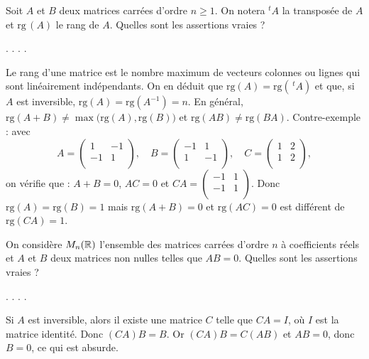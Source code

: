 \begin{question}
Soit $A$ et $B$ deux matrices carrées d'ordre $n\ge 1$. On notera $^tA$ la transposée de $A$ et $\mbox{rg}\, (A)$ le rang de $A$. 
Quelles sont les assertions vraies ?
\begin{answers}  
.
.
.
.   
\end{answers}
\begin{explanations} Le rang d'une matrice est le nombre maximum de vecteurs colonnes ou lignes qui sont linéairement indépendants. On en déduit que $\mbox{rg}(A)=\mbox{rg}(\, ^tA)$ et que, si $A$ est inversible, $\mbox{rg}(A)=\mbox{rg}(A^{-1})=n$.
\vskip0mm
En général, $\mbox{rg}(A+B)\neq \max \big(\mbox{rg}(A), \mbox{rg}(B)\big)$ et $\mbox{rg}(AB)\neq \mbox{rg}(BA)$. Contre-exemple : avec 
$$A = \left(\begin{array}{rc}
1&-1\\-1&1\\ \end{array}\right),\quad B = \left(\begin{array}{rc}
-1&1\\ 1&-1\\ \end{array}\right),\quad C = 
\left(\begin{array}{rc} 1&2\\1&2\\ \end{array}\right),$$
on vérifie que :  $A+B =0$, $AC =0$ et $CA=
\left(\begin{array}{rc}-1&1\\
-1&1\\ \end{array}\right)$. Donc $\mbox{rg}(A)=\mbox{rg}(B)=1$ mais $\mbox{rg}(A+B)=0$ et $\mbox{rg}(AC)= 0$ est différent de $\mbox{rg}(CA)=1$.
\end{explanations}
\end{question}

\begin{question}
On considère $ M_n(\mathbb{R})$ l'ensemble des matrices carrées d'ordre $n$  à coefficients réels et $A$ et $B$ deux matrices non nulles telles que $AB=0$. Quelles sont les assertions vraies ?
\begin{answers}  
.
.
.
.
\end{answers}
\begin{explanations} Si $A$ est inversible, alors il existe une matrice $C$ telle que $CA=I$, où $I$ est la matrice identité. Donc  $(CA)B =B$. Or $(CA)B=C(AB)$ et $AB=0$, donc $B=0$, ce qui est absurde.
\end{explanations}
\end{question}

